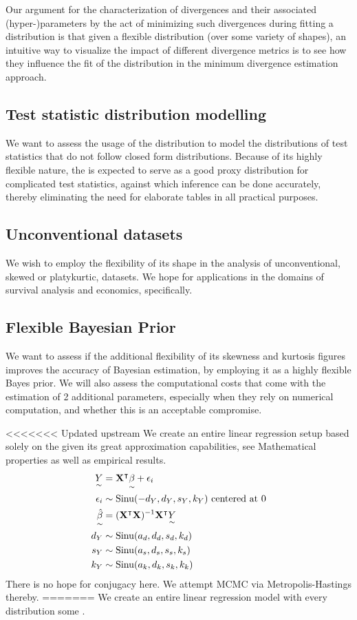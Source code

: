 Our argument for the characterization of divergences and their associated (hyper-)parameters by the act of minimizing such divergences during fitting a distribution is that given a flexible distribution (over some variety of shapes), an intuitive way to visualize the impact of different divergence metrics is to see how they influence the fit of the distribution in the minimum divergence estimation approach.

\subsection{Test statistic distribution modelling}
We want to assess the usage of the distribution to model the distributions of test statistics that do not follow closed form distributions. Because of its highly flexible nature, the \sindist{} is expected to serve as a good proxy distribution for complicated test statistics, against which inference can be done accurately, thereby eliminating the need for elaborate tables in all practical purposes.

\subsection{Unconventional datasets}
We wish to employ the flexibility of its shape in the analysis of unconventional, skewed or platykurtic, datasets. We hope for applications in the domains of survival analysis and economics, specifically.

\subsection{Flexible Bayesian Prior}
We want to assess if the additional flexibility of its skewness and kurtosis figures improves the accuracy of Bayesian estimation, by employing it as a highly flexible Bayes prior. We will also assess the computational costs that come with the estimation of 2 additional parameters, especially when they rely on numerical computation, and whether this is an acceptable compromise.

<<<<<<< Updated upstream
We create an entire linear regression setup based solely on the \sindist{} given its great approximation capabilities, see Mathematical properties as well as empirical results.
\begin{align*}
	\underset{\sim}{Y} &= \mathbf X^\intercal \underset{\sim}{\beta} + \epsilon_i \\
	\epsilon_i &\sim \operatorname*{Sinu}(-d_Y, d_Y, s_Y, k_Y) \text{ centered at 0}\\
	\underset{\sim}{\hat \beta} &= (\mathbf X^\intercal \mathbf X)^{-1} \mathbf X^\intercal \underset{\sim}{Y}\\
	d_Y &\sim \operatorname*{Sinu}(a_d, d_d, s_d, k_d)\\
	s_Y &\sim \operatorname*{Sinu}(a_s, d_s, s_s, k_s)\\
	k_Y &\sim \operatorname*{Sinu}(a_k, d_k, s_k, k_k)
\end{align*}
There is no hope for conjugacy here. We attempt MCMC via Metropolis-Hastings thereby.
=======
We create an entire linear regression model with every distribution some \sindist{}.

